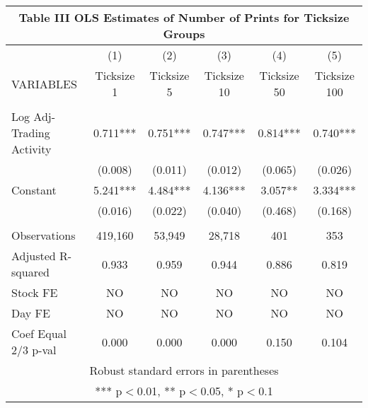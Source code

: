 \documentclass[]{article}
\begin{document}
\begin{tabular}{lccccc}
\multicolumn{6}{c}{Table III OLS Estimates of Number of Prints for Ticksize Groups} \\ \hline
 & (1) & (2) & (3) & (4) & (5) \\
VARIABLES & Ticksize 1 & Ticksize 5 & Ticksize 10 & Ticksize 50 & Ticksize 100 \\ \hline
 &  &  &  &  &  \\
Log Adj-Trading Activity & 0.711*** & 0.751*** & 0.747*** & 0.814*** & 0.740*** \\
 & (0.008) & (0.011) & (0.012) & (0.065) & (0.026) \\
Constant & 5.241*** & 4.484*** & 4.136*** & 3.057** & 3.334*** \\
 & (0.016) & (0.022) & (0.040) & (0.468) & (0.168) \\
 &  &  &  &  &  \\
Observations & 419,160 & 53,949 & 28,718 & 401 & 353 \\
Adjusted R-squared & 0.933 & 0.959 & 0.944 & 0.886 & 0.819 \\
Stock FE & NO & NO & NO & NO & NO \\
Day FE & NO & NO & NO & NO & NO \\
 Coef Equal 2/3 p-val & 0.000 & 0.000 & 0.000 & 0.150 & 0.104 \\ \hline
\multicolumn{6}{c}{ Robust standard errors in parentheses} \\
\multicolumn{6}{c}{ *** p$<$0.01, ** p$<$0.05, * p$<$0.1} \\
\end{tabular}
\end{document}
